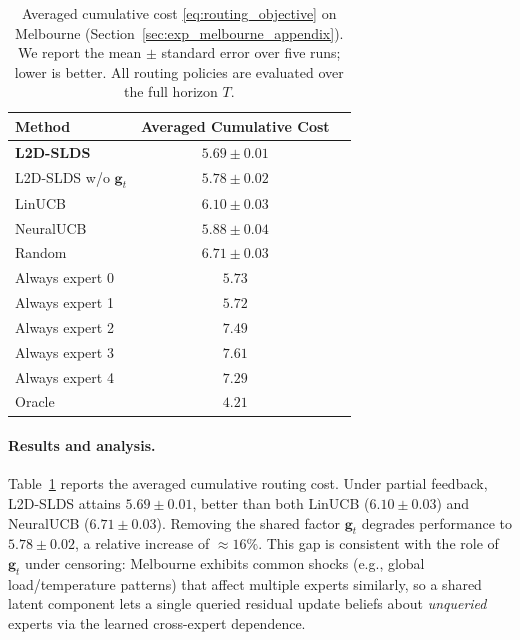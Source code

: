 \begin{table}[ht]
\centering
\small
\setlength{\tabcolsep}{4pt}
\caption{Averaged cumulative cost \eqref{eq:routing_objective} on Melbourne (Section~\ref{sec:exp_melbourne_appendix}).
We report the mean $\pm$ standard error over five runs; lower is better.
All routing policies are evaluated over the full horizon \(T\).}
\label{tab:exp_avg_costs_melbourne_appendix}
\begin{tabular}{@{}lcc@{}}
\toprule
Method & Averaged Cumulative Cost  \\
\midrule
\textbf{L2D-SLDS} & \(\mathbf{5.69 \pm 0.01}\)  \\
L2D-SLDS w/o \(\mathbf{g}_t\) & \(5.78 \pm 0.02\) \\
\midrule
LinUCB & \(6.10 \pm 0.03\)  \\
NeuralUCB & \(5.88 \pm 0.04\)  \\
Random & \(6.71 \pm 0.03\)  \\
Always expert 0 & \(5.73\)  \\
Always expert 1 & \(5.72\) \\
Always expert 2 & \(7.49\) \\
Always expert 3 & \(7.61\) \\
Always expert 4 & \(7.29\)  \\
Oracle & \(4.21\)  \\
\bottomrule
\end{tabular}
\end{table}

\paragraph{Results and analysis.}
Table~\ref{tab:exp_avg_costs_melbourne_appendix} reports the averaged cumulative routing cost. Under partial feedback, L2D-SLDS attains
\(5.69 \pm 0.01\), better than both LinUCB (\(6.10 \pm 0.03\)) and NeuralUCB (\(6.71 \pm 0.03\)). Removing the shared factor
\(\mathbf{g}_t\) degrades performance to \(5.78 \pm 0.02\), a relative increase of \(\approx 16\%\).
This gap is consistent with the role of \(\mathbf{g}_t\) under censoring: Melbourne exhibits common shocks (e.g., global
load/temperature patterns) that affect multiple experts similarly, so a shared latent component lets a single queried residual
update beliefs about \emph{unqueried} experts via the learned cross-expert dependence.

